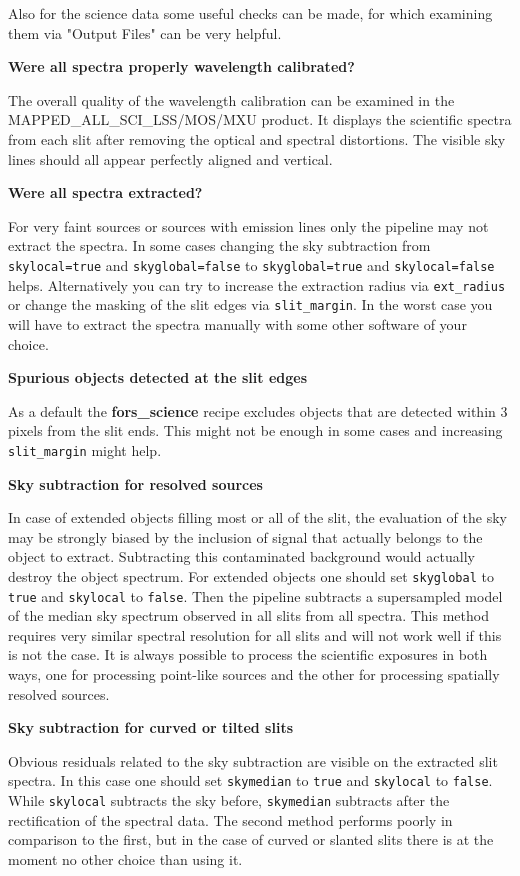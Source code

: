 Also for the science data some useful checks can be made, for which examining them via "Output Files"  can be very helpful.

{\bf Were all spectra properly wavelength calibrated?}

The overall quality of the wavelength calibration can be examined in the MAPPED\_ALL\_SCI\_LSS/MOS/MXU product. It displays the scientific spectra from each slit after removing the optical and spectral distortions. The visible sky lines should all appear perfectly aligned and vertical.

{\bf Were all spectra extracted?}

For very faint sources or sources with emission lines only the pipeline may not extract the spectra. In some cases changing the sky subtraction from {\tt skylocal=true} and {\tt skyglobal=false} to {\tt skyglobal=true}
and {\tt skylocal=false} helps. Alternatively you can try to increase the extraction radius via {\tt ext\_radius} or change the masking of the slit edges via {\tt slit\_margin}. In the worst case you will have to extract the
spectra manually with some other software of your choice.

{\bf Spurious objects detected at the slit edges}

As a default the {\bf fors\_science} recipe excludes objects that are detected within 3 pixels from the slit ends.
This might not be enough in some cases and increasing {\tt slit\_margin} might help.

{\bf Sky subtraction for resolved sources}

In case of extended objects filling most or all of the slit, the evaluation of the sky may be strongly biased by the inclusion of signal that actually belongs to the object to extract. Subtracting this contaminated
background would actually destroy the object spectrum.
For extended objects one should set {\tt skyglobal} to {\tt true} and {\tt skylocal} to {\tt false}. Then the pipeline subtracts a supersampled model of the median sky spectrum observed in all slits from all spectra. This
method requires very similar spectral resolution for all slits and will not work well if this is not the case. It is always possible to process the scientific exposures in both ways, one for processing point-like sources
and the other for processing spatially resolved sources.

{\bf Sky subtraction for curved or tilted slits}

Obvious residuals related to the sky subtraction are visible on the extracted slit spectra. In this case one should set {\tt skymedian} to {\tt true} and {\tt skylocal} to {\tt false}. While {\tt skylocal} subtracts the sky before, {\tt skymedian} subtracts after the rectification of the spectral data. The second method performs poorly in comparison to the first, but in the case of curved or slanted slits there is at the moment no other choice than using it.
